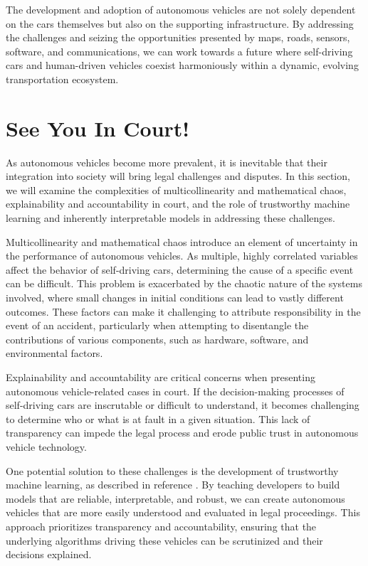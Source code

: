 The development and adoption of autonomous vehicles are not solely dependent on the cars themselves but also on the supporting infrastructure. By addressing the challenges and seizing the opportunities presented by maps, roads, sensors, software, and communications, we can work towards a future where self-driving cars and human-driven vehicles coexist harmoniously within a dynamic, evolving transportation ecosystem.

\section{See You In Court!}

As autonomous vehicles become more prevalent, it is inevitable that their integration into society will bring legal challenges and disputes. In this section, we will examine the complexities of multicollinearity and mathematical chaos, explainability and accountability in court, and the role of trustworthy machine learning and inherently interpretable models in addressing these challenges.

Multicollinearity and mathematical chaos introduce an element of uncertainty in the performance of autonomous vehicles. As multiple, highly correlated variables affect the behavior of self-driving cars, determining the cause of a specific event can be difficult. This problem is exacerbated by the chaotic nature of the systems involved, where small changes in initial conditions can lead to vastly different outcomes. These factors can make it challenging to attribute responsibility in the event of an accident, particularly when attempting to disentangle the contributions of various components, such as hardware, software, and environmental factors.

Explainability and accountability are critical concerns when presenting autonomous vehicle-related cases in court. If the decision-making processes of self-driving cars are inscrutable or difficult to understand, it becomes challenging to determine who or what is at fault in a given situation. This lack of transparency can impede the legal process and erode public trust in autonomous vehicle technology.

One potential solution to these challenges is the development of trustworthy machine learning, as described in reference \cite{trustworthyml}. By teaching developers to build models that are reliable, interpretable, and robust, we can create autonomous vehicles that are more easily understood and evaluated in legal proceedings. This approach prioritizes transparency and accountability, ensuring that the underlying algorithms driving these vehicles can be scrutinized and their decisions explained. 

